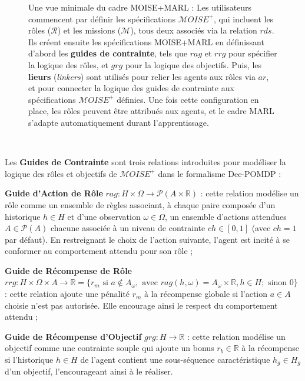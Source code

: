 \documentclass[pdflatex,sn-mathphys-num]{sn-jnl}%
\theoremstyle{thmstyleone}%
\theoremstyle{thmstyletwo}%
\theoremstyle{thmstylethree}%
\begin{document}
\begin{figure}[h!]
    \centering
    
    \caption{Une vue minimale du cadre MOISE+MARL :
        Les utilisateurs commencent par définir les spécifications $\mathcal{M}OISE^+$, qui incluent les rôles ($\mathcal{R}$) et les missions ($\mathcal{M}$), tous deux associés via la relation $rds$.  
        Ils créent ensuite les spécifications MOISE+MARL en définissant d'abord les \textbf{guides de contrainte}, tels que $rag$ et $rrg$ pour spécifier la logique des rôles, et $grg$ pour la logique des objectifs.  
        Puis, les \textbf{lieurs} (\textit{linkers}) sont utilisés pour relier les agents aux rôles via $ar$, et pour connecter la logique des guides de contrainte aux spécifications $\mathcal{M}OISE^+$ définies.  
        Une fois cette configuration en place, les rôles peuvent être attribués aux agents, et le cadre MARL s'adapte automatiquement durant l'apprentissage.}
    \label{fig:mm_synthesis}
\end{figure}

\

\noindent Les \textbf{Guides de Contrainte} sont trois relations introduites pour modéliser la logique des rôles et objectifs de $\mathcal{M}OISE^+$ dans le formalisme Dec-POMDP :

\begin{enumerate*}[label={\roman*) },itemjoin={; \quad}]
    \item \textbf{Guide d'Action de Rôle} \quad $rag: H \times \Omega \rightarrow \mathcal{P}(A \times \mathbb{R})$ : cette relation modélise un rôle comme un ensemble de règles associant, à chaque paire composée d'un historique $h \in H$ et d'une observation $\omega \in \Omega$, un ensemble d'actions attendues $A \in \mathcal{P}(A)$ chacune associée à un niveau de contrainte $ch \in [0,1]$ (avec $ch = 1$ par défaut). En restreignant le choix de l'action suivante, l'agent est incité à se conformer au comportement attendu pour son rôle ;
    
    \item \textbf{Guide de Récompense de Rôle} \quad $rrg: H \times \Omega \times A \to \mathbb{R} = \{r_m \text{ si } a \notin A_\omega, \text{ avec } rag(h, \omega) = A_\omega \times \mathbb{R}, h \in H; \text{ sinon } 0\}$ : cette relation ajoute une pénalité $r_m$ à la récompense globale si l'action $a \in A$ choisie n'est pas autorisée. Elle encourage ainsi le respect du comportement attendu ;
    
    \item \textbf{Guide de Récompense d'Objectif} \quad $grg: H \rightarrow \mathbb{R}$ : cette relation modélise un objectif comme une contrainte souple qui ajoute un bonus $r_b \in \mathbb{R}$ à la récompense si l'historique $h \in H$ de l'agent contient une sous-séquence caractéristique $h_g \in H_g$ d'un objectif, l'encourageant ainsi à le réaliser.
\end{enumerate*}
\end{document}
